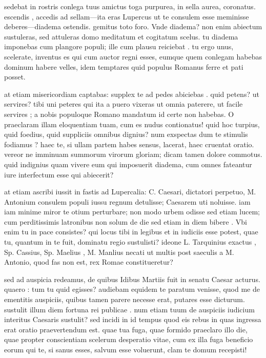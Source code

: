  sedebat in rostris conlega tuus amictus toga purpurea, in sella aurea, coronatus. escendis , accedis ad sellam—ita eras Lupercus ut te consulem esse meminisse deberes—diadema ostendis. gemitus toto foro. Vnde diadema? non enim abiectum sustuleras, sed attuleras domo meditatum et cogitatum scelus. tu diadema imponebas cum plangore populi; ille cum plausu reiciebat . tu ergo unus, scelerate, inventus es qui cum auctor regni esses, eumque quem conlegam habebas dominum habere velles, idem temptares quid populus Romanus ferre et pati posset.

 at etiam misericordiam captabas: supplex te ad pedes abiciebas . quid petens? ut servires? tibi uni peteres qui ita a puero vixeras ut omnia paterere, ut facile servires ; a nobis populoque Romano mandatum id certe non habebas. O praeclaram illam eloquentiam tuam, cum es nudus contionatus! quid hoc turpius, quid foedius, quid suppliciis omnibus dignius? num exspectas dum te stimulis fodiamus ? haec te, si ullam partem habes sensus, lacerat, haec cruentat oratio. vereor ne imminuam summorum virorum gloriam; dicam tamen dolore commotus. quid indignius quam vivere eum qui imposuerit diadema, cum omnes fateantur iure interfectum esse qui abiecerit?

 at etiam ascribi iussit in fastis ad Lupercalia: C. Caesari, dictatori perpetuo, M. Antonium consulem populi iussu regnum detulisse; Caesarem uti noluisse. iam iam minime miror te otium perturbare; non modo urbem odisse sed etiam lucem; cum perditissimis latronibus non solum de die sed etiam in diem bibere . Vbi enim tu in pace consistes? qui locus tibi in legibus et in iudiciis esse potest, quae tu, quantum in te fuit, dominatu regio sustulisti? ideone L. Tarquinius exactus , Sp. Cassius, Sp. Maelius , M. Manlius necati ut multis post saeculis a M. Antonio, quod fas non est, rex Romae constitueretur?

 sed ad auspicia redeamus, de quibus Idibus Martiis fuit in senatu Caesar acturus. quaero : tum tu quid egisses? audiebam equidem te paratum venisse, quod me de ementitis auspiciis, quibus tamen parere necesse erat, putares esse dicturum. sustulit illum diem fortuna rei publicae . num etiam tuum de auspiciis iudicium interitus Caesaris sustulit? sed incidi in id tempus quod eis rebus in quas ingressa erat oratio praevertendum est. quae tua fuga, quae formido praeclaro illo die, quae propter conscientiam scelerum desperatio vitae, cum ex illa fuga beneficio eorum qui te, si sanus esses, salvum esse voluerunt, clam te domum recepisti!

